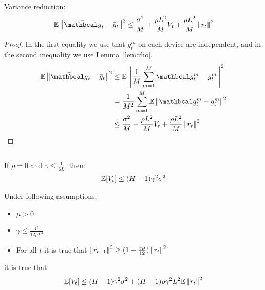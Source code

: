 \begin{lemma} \label{lem:var_red}
    Variance reduction:
    \begin{align}
        \E \norm{\bar{\mc{g}}_t - \bar{g}_t}^2 
        \leq 
        \frac{\sigma^2}{M} + \frac{\rho L^2 }{M} V_t  + \frac{\rho L^2 }{M} \norm{r_t}^2
    \end{align}
\end{lemma}
\begin{proof} In the first equality we use that $g^m_t$ on each device are independent, and in the second inequality we use Lemma~\ref{lem:rho}.
    \begin{align}
        \E \norm{\bar{\mc{g}}_t - \bar{g}_t}^2 
        &\leq 
        \E \norm{\fsumm{m=1}{M}{\mc{g}^m_t - g^m_t}}^2 \\
        &=
        \frac{1}{M^2} \summ{m=1}{M} \E \norm{\mc{g}^m_t - g^m_t}^2 \\
        &\leq
        \frac{\sigma^2}{M} + \frac{\rho L^2 }{M} V_t  + \frac{\rho L^2 }{M} \norm{r_t}^2
    \end{align}
\end{proof}



\begin{lemma} \label{lem:lemma_Vt}

$\,$ 

    If $\rho = 0$ and $\gamma \leq \frac{1}{6L}$, then:
    \begin{align}
        \mathbb{E} [V_t] 
        \leq 
        (H - 1) \gamma^2 \sigma^2
    \end{align}

    Under following assumptions:
    
    \begin{itemize}

    \item $\mu > 0$
    \item $\gamma \leq \frac{\mu}{12\rho L^2}$
    \item For all $t$ it is true that $\left\|r_{t+1}\right\|^2 \geq (1-\frac{\gamma \mu}{12}) \left\|r_t\right\|^2$

    \end{itemize}
    
    it is true that
    \begin{align}
        \mathbb{E} [V_t]
        \leq
        (H-1) \gamma^2 \sigma^2 +
        (H-1) \rho \gamma^2 L^2 \mathbb{E} \left\|r_t\right\|^2
    \end{align}

\end{lemma}

